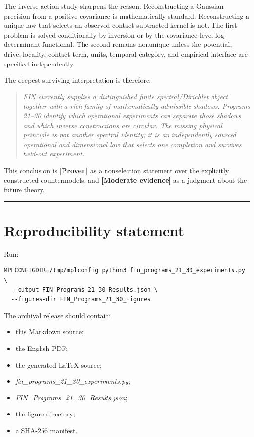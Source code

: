 \documentclass[11pt,a4paper,openany]{report}
\newcommand{\statusProven}{\textcolor{fingreen}{[Proven]}}
\newcommand{\statusModerate}{\textcolor{finviolet}{[Moderate evidence]}}
\begin{document}
The inverse-action study sharpens the reason. Reconstructing a Gaussian precision from a positive covariance is mathematically standard. Reconstructing a unique law that selects an observed contact-subtracted kernel is not. The first problem is solved conditionally by inversion or by the covariance-level log-determinant functional. The second remains nonunique unless the potential, drive, locality, contact term, units, temporal category, and empirical interface are specified independently.

The deepest surviving interpretation is therefore:

\begin{quote}\itshape
FIN currently supplies a distinguished finite spectral/\allowbreak{}Dirichlet object together with a rich family of mathematically admissible shadows. Programs 21–30 identify which operational experiments can separate those shadows and which inverse constructions are circular. The missing physical principle is not another spectral identity; it is an independently sourced operational and dimensional law that selects one completion and survives held-out experiment.

\end{quote}

This conclusion is \textbf{\statusProven{}} as a nonselection statement over the explicitly constructed countermodels, and \textbf{\statusModerate{}} as a judgment about the future theory.

\par\medskip\hrule\medskip

\chapter{Reproducibility statement}

Run:

\begin{Verbatim}[fontsize=\small]
MPLCONFIGDIR=/tmp/mplconfig python3 fin_programs_21_30_experiments.py \
  --output FIN_Programs_21_30_Results.json \
  --figures-dir FIN_Programs_21_30_Figures
\end{Verbatim}

The archival release should contain:

\begin{itemize}
\item 
this Markdown source;

\item 
the English PDF;

\item 
the generated LaTeX source;

\item 
\emph{fin\_programs\_21\_30\_experiments.py};

\item 
\emph{FIN\_Programs\_21\_30\_Results.json};

\item 
the figure directory;

\item 
a SHA-256 manifest.

\end{itemize}
\end{document}
